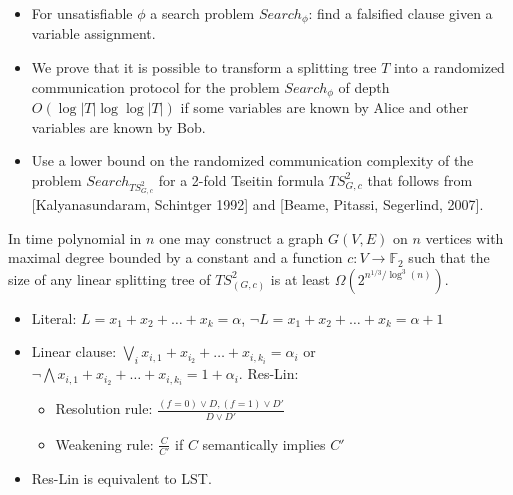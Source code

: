 {
\begin{itemize}
\item For unsatisfiable $\phi$ a search problem $Search_\phi$: find a
falsified clause given a variable assignment. 
\item We prove that it is possible to transform a splitting tree $T$ into a randomized
communication protocol for the problem $Search_\phi$ of depth $O(\log |T|\log\log|T|)$ if some variables are known by Alice and
other variables are known by Bob. 
\item Use a lower bound on the randomized communication complexity of 
the problem $Search_{TS^2_{G,c}}$ for a 2-fold Tseitin formula $TS^2_{G,c}$ that follows from %
[Kalyanasundaram, Schintger 1992] and
[Beame, Pitassi, Segerlind, 2007].
\end{itemize}
\pause
\myth In time polynomial in $n$ one may construct a graph $G(V, E)$ on $n$ vertices
    with maximal degree bounded by a constant and a function $c: V\to \mathbb{F}_2$
    such that the size of any linear splitting tree of $TS^2_{(G,c)}$ is at least
    $\Omega\left(2^{n^{1/3} / \log^3(n)}\right)$.
}

{
\begin{itemize}
\item Literal: $L=x_{1}+x_{2}+\dots + x_{k}=\alpha$, $\lnot L=x_{1}+x_{2}+\dots + x_{k}=\alpha+1$
\item Linear clause: $\bigvee_i x_{i,1}+x_{i_2}+\dots + x_{i, k_i}=\alpha_i$ or $\lnot \bigwedge x_{i,1}+x_{i_2}+\dots + x_{i, k_i}=1+\alpha_i$.
\pitem Res-Lin:
\begin{itemize}
\item Resolution rule: $\frac{(f = 0) \lor D, (f = 1) \lor D'}{D \lor D'}$
\item Weakening rule: $\frac{C}{C'}$ if $C$ semantically implies $C'$
\end{itemize}
\item {} Res-Lin is equivalent to LST.
\end{itemize}
}           



